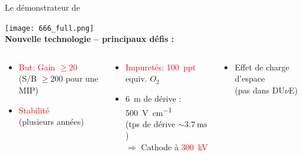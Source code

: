     \begin{frame}{Le démonstrateur de \SSS{}}
    	\begin{scriptsize}
                \centering
    			\vspace{-0.45cm}\texttt{[image: 666\_full.png]}\\
    			\vfill
    			\textbf{Nouvelle technologie -- principaux défis :}\\
    			\vfill
    			\begin{columns}
           			\begin{column}{0.36\textwidth}
           				\hspace{-0.5cm}\begin{itemize}
           					\item \textcolor{red}{But: Gain $\geq 20$} \\(S/B $\geq 200$ pour une MIP)
           					\item \textcolor{red}{Stabilité} \\ (plusieurs années)
           				\end{itemize}
           			\end{column}
           			\begin{column}{0.37\textwidth}
           				\begin{itemize}
           					\item \textcolor{red}{Impuretés: \SI{100}{ppt}} \\ equiv. $O_2$
           					\item \SI{6}{\meter} de dérive : \SI{500}{\volt\per\centi\meter} \\ (tps de dérive $\sim\SI{3.7}{\milli\second}$) \\ $\Rightarrow$ Cathode à \textcolor{red}{\SI{300}{\kilo\volt}}
           				\end{itemize}
            		\end{column}
            		\begin{column}{0.4\textwidth}
            			\hspace{-0.5cm}\begin{itemize}
           					\item[\textcolor{red}{\danger}] Effet de charge d'espace \\ (pas dans DU$\nu$E)
            			\end{itemize}
            		\end{column}
    			\end{columns}
    	\end{scriptsize} 
    \end{frame}
    
